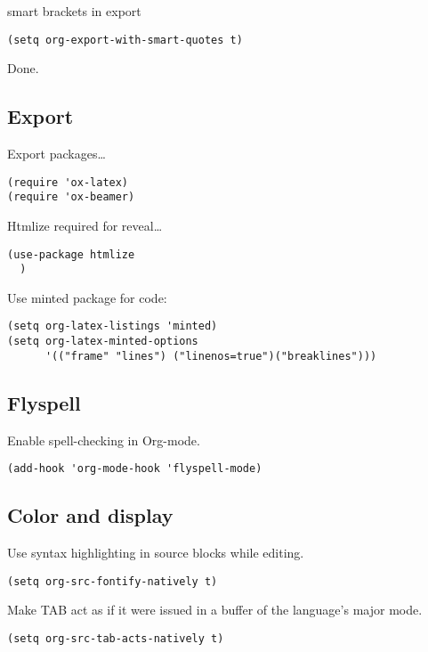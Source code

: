 \documentclass[12pt]{article}
\begin{document}
smart brackets in export

\begin{verbatim}
(setq org-export-with-smart-quotes t)
\end{verbatim}

Done.
\subsection{Export}
\label{sec:org7668c71}

Export packages\ldots{}

\begin{verbatim}
(require 'ox-latex)
(require 'ox-beamer)
\end{verbatim}

Htmlize required for reveal\ldots{}

\begin{verbatim}
(use-package htmlize
  )
\end{verbatim}

Use minted package for code: 

\begin{verbatim}
(setq org-latex-listings 'minted)
(setq org-latex-minted-options
      '(("frame" "lines") ("linenos=true")("breaklines")))
\end{verbatim}

\subsection{Flyspell}
\label{sec:orgabbb706}
Enable spell-checking in Org-mode.
\begin{verbatim}
(add-hook 'org-mode-hook 'flyspell-mode)
\end{verbatim}

\subsection{Color and display}
\label{sec:org675e1bf}

Use syntax highlighting in source blocks while editing.
\begin{verbatim}
(setq org-src-fontify-natively t)
\end{verbatim}

Make TAB act as if it were issued in a buffer of the language’s major mode.
\begin{verbatim}
(setq org-src-tab-acts-natively t)
\end{verbatim}
\end{document}
